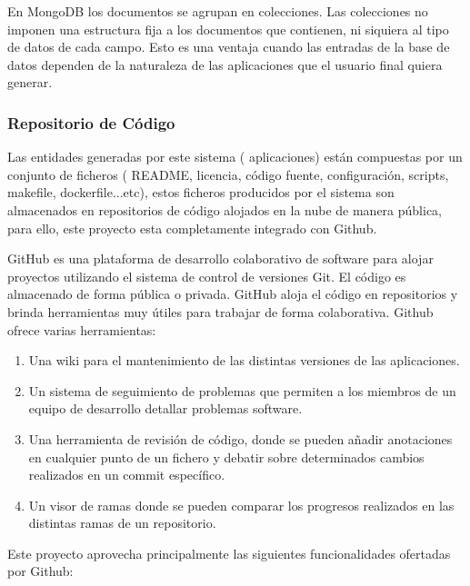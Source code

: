 \documentclass[a4paper,11pt]{book}
\begin{document}
En MongoDB los documentos se agrupan en colecciones. Las colecciones  no imponen una estructura fija a los documentos que contienen, ni siquiera al tipo de datos de cada campo. Esto es una ventaja cuando las entradas de la base de datos dependen de la naturaleza de las aplicaciones que el usuario final quiera generar.


\subsubsection{Repositorio de Código}

Las entidades generadas por este sistema ( aplicaciones) están compuestas por un conjunto de ficheros ( README, licencia, código fuente, configuración, scripts, makefile, dockerfile...etc), estos ficheros producidos por el sistema son almacenados en repositorios de código alojados en la nube de manera pública, para ello, este proyecto esta completamente integrado con Github\cite{github}.

GitHub\cite{github} es una plataforma de desarrollo colaborativo de software para alojar proyectos utilizando el sistema de control de versiones Git. El código es almacenado de forma pública o privada. GitHub aloja el código en repositorios y brinda herramientas muy útiles para trabajar de forma colaborativa. Github\cite{github2} ofrece varias herramientas:

\begin{enumerate}
\item Una wiki para el mantenimiento de las distintas versiones de las aplicaciones.
\item Un sistema de seguimiento de problemas que permiten a los miembros de un equipo de desarrollo detallar problemas software.
\item Una herramienta de revisión de código, donde se pueden añadir anotaciones en cualquier punto de un fichero y debatir sobre determinados cambios realizados en un commit específico.
\item Un visor de ramas donde se pueden comparar los progresos realizados en las distintas ramas de un repositorio.
\end{enumerate}


Este proyecto aprovecha principalmente las siguientes funcionalidades ofertadas por Github:
\end{document}
